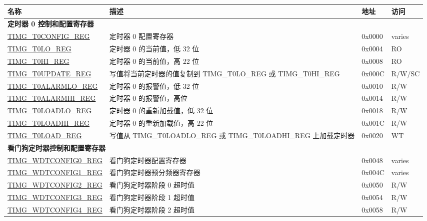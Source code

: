 \begin{longtable}{ | p{6cm} | p{7.2cm} | p{1.3cm} | p{1cm} | }
\hline\rowcolor{lightgray}
名称 & 描述 &  地址 & 访问 \\ \hline
\endhead
\multicolumn{4}{|l|}{\textbf{定时器 0 控制和配置寄存器}} \\ \hline
\hyperref[regdesc:TIMGTXCONFIGREG]{TIMG\_T0CONFIG\_REG} & 定时器 0 配置寄存器 & 0x0000 & varies \\ \hline
\hyperref[regdesc:TIMGTXLOREG]{TIMG\_T0LO\_REG} & 定时器 0 的当前值，低 32 位 & 0x0004 & RO \\ \hline
\hyperref[regdesc:TIMGTXHIREG]{TIMG\_T0HI\_REG} & 定时器 0 的当前值，高 22 位 & 0x0008 & RO \\ \hline
\hyperref[regdesc:TIMGTXUPDATEREG]{TIMG\_T0UPDATE\_REG} & 写值将当前定时器的值复制到 TIMG\_T0LO\_REG 或 TIMG\_T0HI\_REG & 0x000C & R/W/SC \\ \hline
\hyperref[regdesc:TIMGTXALARMLOREG]{TIMG\_T0ALARMLO\_REG} & 定时器 0 的报警值，低 32 位 & 0x0010 & R/W \\ \hline
\hyperref[regdesc:TIMGTXALARMHIREG]{TIMG\_T0ALARMHI\_REG} & 定时器 0 的报警值，高位 & 0x0014 & R/W \\ \hline
\hyperref[regdesc:TIMGTXLOADLOREG]{TIMG\_T0LOADLO\_REG} & 定时器 0 的重新加载值，低 32 位 & 0x0018 & R/W \\ \hline
\hyperref[regdesc:TIMGTXLOADHIREG]{TIMG\_T0LOADHI\_REG} & 定时器 0 的重新加载值，高 22 位 & 0x001C & R/W \\ \hline
\hyperref[regdesc:TIMGTXLOADREG]{TIMG\_T0LOAD\_REG} & 写值从 TIMG\_T0LOADLO\_REG 或 TIMG\_T0LOADHI\_REG 上加载定时器 & 0x0020 & WT \\ \hline
\multicolumn{4}{|l|}{\textbf{看门狗定时器控制和配置寄存器}} \\ \hline
\hyperref[regdesc:TIMGWDTCONFIG0REG]{TIMG\_WDTCONFIG0\_REG} & 看门狗定时器配置寄存器 & 0x0048 & varies \\ \hline
\hyperref[regdesc:TIMGWDTCONFIG1REG]{TIMG\_WDTCONFIG1\_REG} & 看门狗定时器预分频器寄存器 & 0x004C & varies \\ \hline
\hyperref[regdesc:TIMGWDTCONFIG2REG]{TIMG\_WDTCONFIG2\_REG} & 看门狗定时器阶段 0 超时值 & 0x0050 & R/W \\ \hline
\hyperref[regdesc:TIMGWDTCONFIG3REG]{TIMG\_WDTCONFIG3\_REG} & 看门狗定时器阶段 1 超时值 & 0x0054 & R/W \\ \hline
\hyperref[regdesc:TIMGWDTCONFIG4REG]{TIMG\_WDTCONFIG4\_REG} & 看门狗定时器阶段 2 超时值 & 0x0058 & R/W \\ \hline

\end{longtable}

